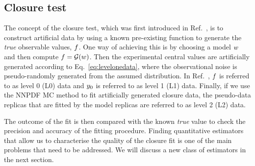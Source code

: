 \subsection{Closure test}
\label{sec:closure-test-intro}

The concept of the closure test, which was first introduced in
Ref.~\cite{nnpdf30}, is to construct artificial data by using a known
pre-existing function to generate the {\em true} observable values, $f$. One
way of achieving this is by choosing a model $w$ and then compute $f
= \mathcal{G}(w)$. Then the experimental central values are artificially
generated according to Eq.~\ref{eq:levelonedata}, where the observational noise
is pseudo-randomly generated from the assumed distribution. In
Ref.~\cite{nnpdf30}, $f$ is referred to as level 0 (L0) data and
$y_0$ is referred to as level 1 (L1) data. Finally, if we use the
NNPDF MC method to fit artificially generated closure data, the pseudo-data
replicas that are fitted by the model replicas are referred to as level 2 (L2)
data.

The outcome of the fit is then compared with the known {\em true} value to check
the precision and accuracy of the fitting procedure. Finding quantitative
estimators that allow us to characterise the quality of the closure fit is one
of the main problems that need to be addressed. We will discuss a new class of
estimators in the next section. 

